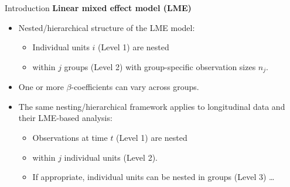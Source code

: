 \documentclass{beamer}
\begin{document}
\begin{frame}{Introduction}
\textbf{Linear mixed effect model (LME)} 
\medskip
\begin{itemize}
\item Nested/hierarchical structure of the LME model:
\medskip
\begin{itemize}
    \item Individual units $i$ (Level 1) are nested
    \medskip
    \item within $j$ groups (Level 2) with group-specific observation sizes $n_j$.
\end{itemize}
\medskip
\item One or more $\beta$-coefficients can vary across groups.
\bigskip
\item The same nesting/hierarchical framework applies to longitudinal data and their LME-based analysis:
\medskip
\begin{itemize}
    \item Observations at time $t$ (Level 1) are nested
    \smallskip
    \item within $j$ individual units (Level 2).
    \smallskip
    \item If appropriate, individual units can be nested in groups (Level 3) \dots 
\end{itemize}
\end{itemize}
\end{frame}
\end{document}
